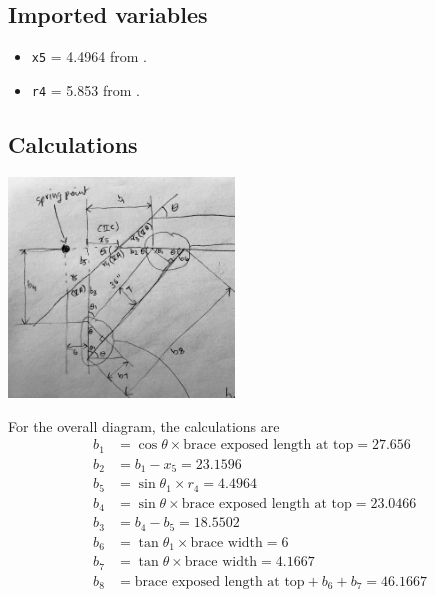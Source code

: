 \documentclass{article}\usepackage[]{graphicx}\usepackage[]{xcolor}
\begin{document}
\subsection{Imported variables}
\begin{itemize}
  \item \verb+x5+ = 4.4964 from .
  \item \verb+r4+ = 5.853 from .
\end{itemize}

\subsection{Calculations} \label{braces-calculations}


\begin{center}\end{center}

\begin{center}
	\includegraphics[width=0.45\textwidth]{images/braces_overall}
\end{center}

For the overall diagram, the calculations are
\begin{align*}
  b_1 &= \cos\theta\times \text{brace exposed length at top} = 27.656\\
  b_2 &= b_1 - x_5 = 23.1596\\
  b_5 &= \sin\theta_1\times r_4 = 4.4964\\
  b_4 &= \sin\theta\times \text{brace exposed length at top} = 23.0466\\
  b_3 &= b_4 - b_5 = 18.5502\\
  b_6 &= \tan\theta_1\times \text{brace width} = 6\\
  b_7 &= \tan\theta\times \text{brace width} = 4.1667\\
  b_8 &= \text{brace exposed length at top} + b_6 + b_7 = 46.1667\\
\end{align*}
\end{document}

